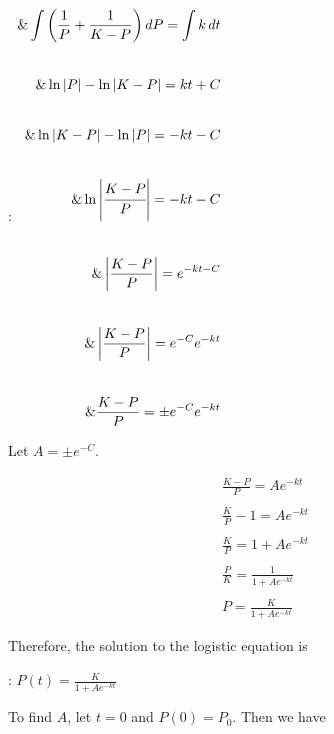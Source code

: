 :   $\begin{aligned}

    \& \int\left(\frac{1}{P}+\frac{1}{K-P}\right) dP=\int k\,dt \\\\[6pt]

    \& \ln|P|-\ln|K-P|=kt+C \\\\[6pt]

    \& \ln|K-P|-\ln|P|=-kt-C \\\\[6pt]

    \& \ln\left|\cfrac{K-P}{P}\right|=-kt-C \\\\[6pt]

    \& \left|\dfrac{K-P}{P}\right|=e^{-kt-C} \\\\[6pt]

    \& \left|\dfrac{K-P}{P}\right|=e^{-C}e^{-kt} \\\\[6pt]

    \& \frac{K-P}{P}=\pm e^{-C}e^{-kt}

    \end{aligned}$



Let $A=\pm e^{-C}$.



\begin{align}
& \frac{K-P}{P}=Ae^{-kt} \\\\[6pt]

& \frac{K}{P}-1=Ae^{-kt} \\\\[6pt]

& \frac{K}{P}=1+Ae^{-kt} \\\\[6pt]

& \frac{P}{K}=\frac{1}{1+Ae^{-kt}} \\\\[6pt]

& P=\frac{K}{1+Ae^{-kt}}
\end{align}



Therefore, the solution to the logistic equation is



:   $P(t)=\frac{K}{1+Ae^{-kt}}$



To find $A$, let $t=0$ and $P\left(0\right)=P_0$. Then we have



